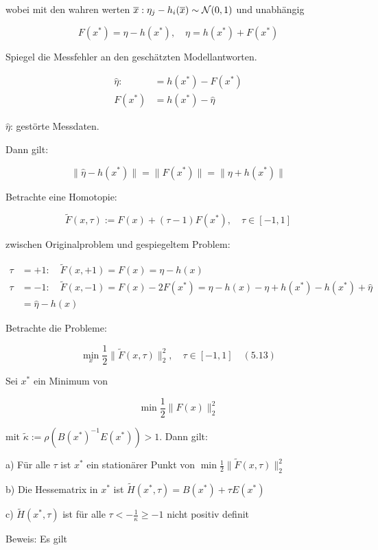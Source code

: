 wobei mit den wahren werten $\overline x: \eta_j - h_i(\overline x) \sim \mathcal N(0,1)$ und unabhängig

\[ F(x^*) = \eta - h(x^*), \quad \eta = h(x^*) + F(x^*) \]

Spiegel die Messfehler an den geschätzten Modellantworten.

\begin{align*}
\hat \eta :&= h(x^*) - F(x^*) \\
F(x^*) &= h(x^*) - \hat \eta
\end{align*}

$\hat \eta$: gestörte Messdaten.

Dann gilt:

\[ \| \hat \eta - h(x^*) \| = \|F(x^*)\| = \|\eta + h(x^*) \| \]

Betrachte eine Homotopie:

\[ \tilde F(x,\tau) := F(x) + (\tau-1) F(x^*), \quad \tau \in [-1,1] \]

zwischen Originalproblem und gespiegeltem Problem:

\begin{align*}
\tau &= +1: \quad \tilde F(x,+1) = F(x) = \eta - h(x) \\
\tau &= -1: \quad \tilde F(x,-1) = F(x) - 2 F(x^*) = \eta - h(x) - \eta + h(x^*) - h(x^*) + \hat \eta \\
&= \hat \eta - h(x)
\end{align*}

Betrachte die Probleme:

\[ \min_x \frac 12 \|\tilde F(x,\tau)\|_2^2, \quad \tau \in [-1,1] \quad (5.13) \]


Sei $x^*$ ein Minimum von

\[ \min \frac 12 \| F(x)\|_2^2 \]

mit $\tilde \kappa := \rho( B(x^*)^{-1} E(x^*) ) > 1$. Dann gilt:

\bitm
\item a) Für alle $\tau$ ist $x^*$ ein stationärer Punkt von $\min \frac 12 \|\tilde F(x,\tau)\|_2^2$
\item b) Die Hessematrix in $x^*$ ist $\tilde H(x^*,\tau) = B(x^*) + \tau E(x^*)$
\item c) $\tilde H(x^*, \tau)$ ist für alle $\tau < - \frac 1\kappa \geq -1 $ nicht positiv definit 
\eitm

Beweis: Es gilt 

